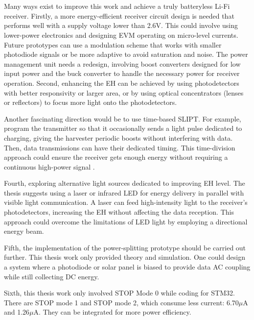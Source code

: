 \chapter{}

Many ways exist to improve this work and achieve a truly batteryless \ac{Li-Fi} receiver. Firstly, a more energy-efficient receiver circuit design is needed that performs well with a supply voltage lower than 2.6V. This could involve using lower-power electronics and designing \ac{EVM} operating on micro-level currents. Future prototypes can use a modulation scheme that works with smaller photodiode signals or be more adaptive to avoid saturation and noise. The power management unit needs a redesign, involving boost converters designed for low input power and the buck converter to handle the necessary power for receiver operation. Second, enhancing the \ac{EH} can be achieved by using photodetectors with better responsivity or larger area, or by using optical concentrators (lenses or reflectors) to focus more light onto the photodetectors.

Another fascinating direction would be to use time-based \ac{SLIPT}\cite{de2024reconfigurable}. For example, program the transmitter so that it occasionally sends a light pulse dedicated to charging, giving the harvester periodic boosts without interfering with data. Then, data transmissions can have their dedicated timing. This time-division approach could ensure the receiver gets enough energy without requiring a continuous high-power signal \cite{de2024reconfigurable} \cite{zhang2013mimo}. 

Fourth, exploring alternative light sources dedicated to improving \ac{EH} level\cite{de2024reconfigurable}. The thesis suggests using a laser or infrared LED for energy delivery in parallel with visible light communication. A laser can feed high-intensity light to the receiver’s photodetectors, increasing the \ac{EH} without affecting the data reception\cite{de2024reconfigurable}. This approach could overcome the limitations of LED light by employing a directional energy beam. 

Fifth, the implementation of the power-splitting prototype should be carried out further. This thesis work only provided theory and simulation. One could design a system where a photodiode or solar panel is biased to provide data AC coupling while still collecting DC energy.

Sixth, this thesis work only involved STOP Mode 0 while coding for STM32. There are STOP mode 1 and STOP mode 2, which consume less current: 6.70\(\mu\)A and 1.26\(\mu\)A. They can be integrated for more power efficiency\cite{pwr}.

